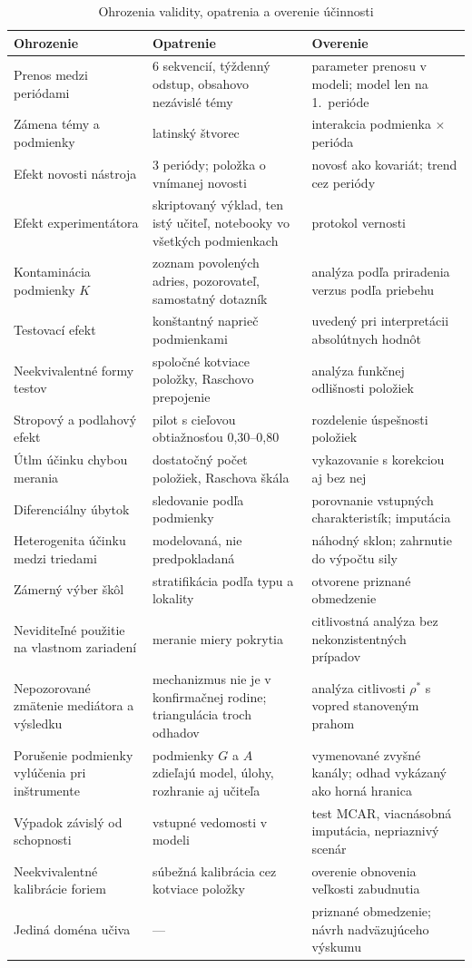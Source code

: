 \begin{table}[H]
\centering
\caption{Ohrozenia validity, opatrenia a overenie účinnosti}
\label{tab:ohrozenia}
\scriptsize
\begin{tabularx}{\textwidth}{@{}l X X@{}}
\toprule
\textbf{Ohrozenie} & \textbf{Opatrenie} & \textbf{Overenie} \\
\midrule
Prenos medzi periódami & 6 sekvencií, týždenný odstup, obsahovo nezávislé témy & parameter prenosu v modeli; model len na 1.~perióde \\
Zámena témy a podmienky & latinský štvorec & interakcia podmienka $\times$ perióda \\
Efekt novosti nástroja & 3 periódy; položka o vnímanej novosti & novosť ako kovariát; trend cez periódy \\
Efekt experimentátora & skriptovaný výklad, ten istý učiteľ, notebooky vo všetkých podmienkach & protokol vernosti \\
Kontaminácia podmienky $K$ & zoznam povolených adries, pozorovateľ, samostatný dotazník & analýza podľa priradenia verzus podľa priebehu \\
Testovací efekt & konštantný naprieč podmienkami & uvedený pri interpretácii absolútnych hodnôt \\
Neekvivalentné formy testov & spoločné kotviace položky, Raschovo prepojenie & analýza funkčnej odlišnosti položiek \\
Stropový a podlahový efekt & pilot s cieľovou obtiažnosťou 0,30--0,80 & rozdelenie úspešnosti položiek \\
Útlm účinku chybou merania & dostatočný počet položiek, Raschova škála & vykazovanie s korekciou aj bez nej \\
Diferenciálny úbytok & sledovanie podľa podmienky & porovnanie vstupných charakteristík; imputácia \\
Heterogenita účinku medzi triedami & modelovaná, nie predpokladaná & náhodný sklon; zahrnutie do výpočtu sily \\
Zámerný výber škôl & stratifikácia podľa typu a lokality & otvorene priznané obmedzenie \\
Neviditeľné použitie na vlastnom zariadení & meranie miery pokrytia & citlivostná analýza bez nekonzistentných prípadov \\
Nepozorované zmätenie mediátora a výsledku & mechanizmus nie je v konfirmačnej rodine; triangulácia troch odhadov & analýza citlivosti $\rho^\ast$ s vopred stanoveným prahom \\
Porušenie podmienky vylúčenia pri inštrumente & podmienky $G$ a $A$ zdieľajú model, úlohy, rozhranie aj učiteľa & vymenované zvyšné kanály; odhad vykázaný ako horná hranica \\
Výpadok závislý od schopnosti & vstupné vedomosti v modeli & test MCAR, viacnásobná imputácia, nepriaznivý scenár \\
Neekvivalentné kalibrácie foriem & súbežná kalibrácia cez kotviace položky & overenie obnovenia veľkosti zabudnutia \\
Jediná doména učiva & --- & priznané obmedzenie; návrh nadväzujúceho výskumu \\
\bottomrule
\end{tabularx}
\end{table}

